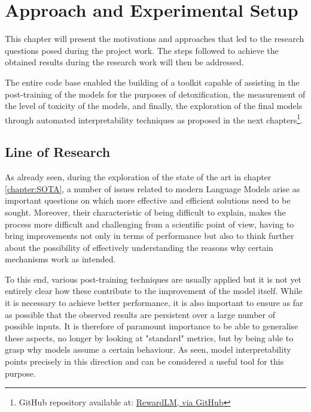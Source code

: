 \chapter{Approach and Experimental Setup}

This chapter will present the motivations and approaches that led to the research questions posed during the project work. The steps followed to achieve the obtained results during the research work will then be addressed.


The entire code base enabled the building of a toolkit capable of assisting in the post-training of the models for the purposes of detoxification, the measurement of the level of toxicity of the models, and finally, the exploration of the final models through automated interpretability techniques as proposed in the next chapters\footnote{GitHub repository available at: \href{https://github.com/DanielSc4/RewardLM}{RewardLM, via GitHub}}.

\section{Line of Research}

As already seen, during the exploration of the state of the art in chapter \ref{chapter:SOTA}, a number of issues related to modern Language Models arise as important questions on which more effective and efficient solutions need to be sought. Moreover, their characteristic of being difficult to explain, makes the process more difficult and challenging from a scientific point of view, having to bring improvements not only in terms of performance but also to think further about the possibility of effectively understanding the reasons why certain mechanisms work as intended.

To this end, various post-training techniques are usually applied but it is not yet entirely clear how these contribute to the improvement of the model itself. While it is necessary to achieve better performance, it is also important to ensure as far as possible that the observed results are persistent over a large number of possible inputs. It is therefore of paramount importance to be able to generalise these aspects, no longer by looking at "standard" metrics, but by being able to grasp why models assume a certain behaviour. As seen, model interpretability points precisely in this direction and can be considered a useful tool for this purpose.

